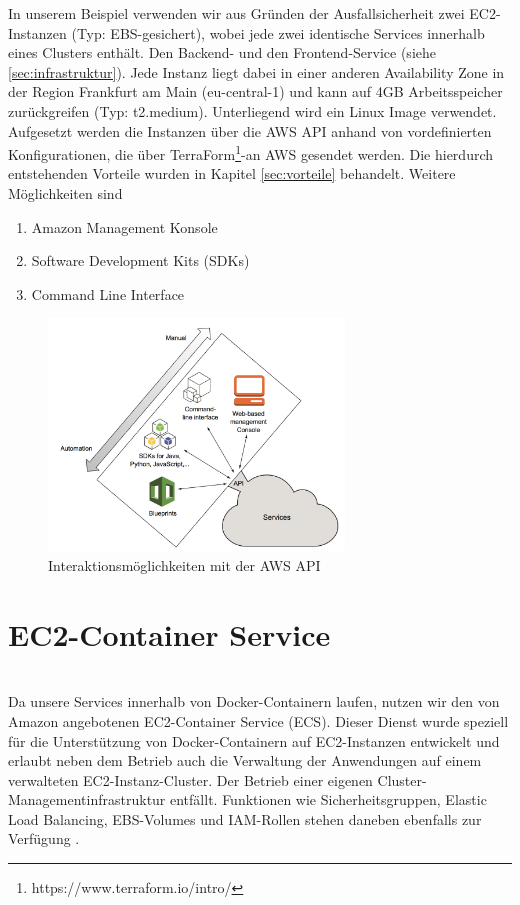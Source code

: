 In unserem Beispiel verwenden wir aus Gründen der Ausfallsicherheit zwei EC2-Instanzen (Typ: EBS-gesichert), wobei jede zwei identische Services innerhalb eines Clusters enthält. Den Backend- und den Frontend-Service (siehe \ref{sec:infrastruktur}). Jede Instanz liegt dabei in einer anderen Availability Zone in der Region Frankfurt am Main (eu-central-1) und kann auf 4GB Arbeitsspeicher zurückgreifen (Typ: t2.medium). Unterliegend wird ein Linux Image verwendet. \\
Aufgesetzt werden die Instanzen über die AWS API anhand von vordefinierten Konfigurationen, die über TerraForm\footnote{https://www.terraform.io/intro/}-an AWS gesendet werden. Die hierdurch entstehenden Vorteile wurden in Kapitel \ref{sec:vorteile} behandelt. Weitere Möglichkeiten sind
\begin{enumerate}
  \item Amazon Management Konsole
  \item Software Development Kits (SDKs)
  \item Command Line Interface
\end{enumerate} \cite{wittig:awsinaction}

\begin{figure}[!ht]
  \centering
  \includegraphics[width=0.7\textwidth]{images/awsapi.png}
  \caption{Interaktionsmöglichkeiten mit der AWS API \cite{wittig:awsinaction}}
\end{figure}

\section{EC2-Container Service}
\label{sec:ecs}
\\Da unsere Services innerhalb von Docker-Containern laufen, nutzen wir den von Amazon angebotenen EC2-Container Service (ECS). Dieser Dienst wurde speziell für die Unterstützung von Docker-Containern auf EC2-Instanzen entwickelt und erlaubt neben dem Betrieb auch die Verwaltung der Anwendungen auf einem verwalteten EC2-Instanz-Cluster. Der Betrieb einer eigenen Cluster-Managementinfrastruktur entfällt. Funktionen wie Sicherheitsgruppen, Elastic Load Balancing, EBS-Volumes und IAM-Rollen stehen daneben ebenfalls zur Verfügung \cite{aws:ecs}.

